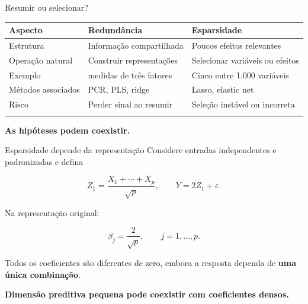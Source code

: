 \documentclass[
  10pt,
  ignorenonframetext,
  aspectratio=169,
  brazilian,
]{beamer}
\newcounter{none} %
\begin{document}
\begin{frame}{Resumir ou selecionar?}
\protect{}\label{resumir-ou-selecionar}
{\def\LTcaptype{none} %
\begin{longtable}[]{@{}
  >{\raggedright\arraybackslash}p{}
  >{\raggedright\arraybackslash}p{}
  >{\raggedright\arraybackslash}p{}@{}}
\toprule\noalign{}
\begin{minipage}[b]{\linewidth}\raggedright
Aspecto
\end{minipage} & \begin{minipage}[b]{\linewidth}\raggedright
Redundância
\end{minipage} & \begin{minipage}[b]{\linewidth}\raggedright
Esparsidade
\end{minipage} \\
\midrule\noalign{}
\endhead
Estrutura & Informação compartilhada & Poucos efeitos relevantes \\
Operação natural & Construir representações & Selecionar variáveis ou
efeitos \\
Exemplo & 100 medidas de três fatores & Cinco entre 1.000 variáveis \\
Métodos associados & PCR, PLS, ridge & Lasso, elastic net \\
Risco & Perder sinal ao resumir & Seleção instável ou incorreta \\
\bottomrule\noalign{}
\end{longtable}
}

\textbf{As hipóteses podem coexistir.}

\end{frame}

\begin{frame}{Esparsidade depende da representação}
\protect{}\label{esparsidade-depende-da-representauxe7uxe3o}
Considere entradas independentes e padronizadas e defina

\[
Z_1=\frac{X_1+\cdots+X_p}{\sqrt p},
\qquad Y=2Z_1+\varepsilon.
\]

Na representação original:

\[
\beta_j=\frac{2}{\sqrt p},\qquad j=1,\ldots,p.
\]

Todos os coeficientes são diferentes de zero, embora a resposta dependa
de \textbf{uma única combinação}.

\textbf{Dimensão preditiva pequena pode coexistir com coeficientes
densos.}
\end{frame}
\end{document}
